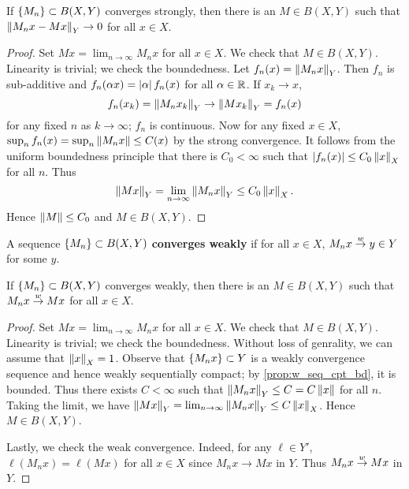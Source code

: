 \begin{proposition}
    If $\left\{ {M_n} \right\}\subset B(X,Y)$ converges strongly, then there is an $M\in B(X,Y)$ such that
    $\left\lVert {M_nx - Mx} \right\rVert_Y\to 0$ for all $x\in X$. 
\end{proposition}
\begin{proof}
    Set $Mx = \lim_{n\to\infty} M_nx$ for all $x\in X$. We check that $M\in B(X,Y)$. 
    Linearity is trivial; we check the boundedness. Let $f_n(x) = \left\lVert {M_nx} \right\rVert_Y$. 
    Then $f_n$ is sub-additive and $f_n(\alpha x) = \left\lvert {\alpha} \right\rvert f_n(x)$ for all $\alpha\in\mathbb{R}$. 
    If $x_k\to x$, 
    \begin{equation*}
        f_n(x_k) = \left\lVert {M_nx_k} \right\rVert_Y\to\left\lVert {Mx_k} \right\rVert_Y = f_n(x)
    \end{equation*}
    for any fixed $n$ as $k\to\infty$; $f_n$ is continuous. Now for any fixed $x\in X$, 
    $\sup_n f_n(x) = \sup_n \left\lVert {M_nx} \right\rVert\leq C(x)$ by the strong convergence. It follows 
    from the uniform boundedness principle that there is $C_0<\infty$ such that 
    $\left\lvert {f_n(x)} \right\rvert\leq C_0\left\lVert {x} \right\rVert_X$ for all $n$. Thus 
    \begin{equation*}
        \left\lVert {Mx} \right\rVert_Y = \lim_{n\to\infty} \left\lVert {M_nx} \right\rVert_Y \leq C_0\left\lVert {x} \right\rVert_X.
    \end{equation*}
    Hence $\left\lVert {M} \right\rVert\leq C_0$ and $M\in B(X,Y)$.
\end{proof}

\begin{definition}
    A sequence $\left\{ {M_n} \right\}\subset B(X,Y)$ \textbf{converges weakly} if for all 
    $x\in X$, $M_nx\overset{w}{\to} y\in Y$ for some $y$. 
\end{definition}

\begin{proposition}
    If $\left\{ {M_n} \right\}\subset B(X,Y)$ converges weakly, then there is an $M\in B(X,Y)$ such that 
    $M_nx\overset{w}{\to} Mx$ for all $x\in X$.
\end{proposition}
\begin{proof}
    Set $Mx = \lim_{n\to\infty} M_nx$ for all $x\in X$. We check that $M\in B(X,Y)$. 
    Linearity is trivial; we check the boundedness. Without loss of genrality, we can 
    assume that $\left\lVert {x} \right\rVert_X = 1$. Observe that $\left\{ {M_nx} \right\}\subset Y$ 
    is a weakly convergence sequence and hence weakly sequentially compact; by 
    \cref{prop:w_seq_cpt_bd}, it is bounded. Thus there exists $C<\infty$ such that
    $\left\lVert {M_nx} \right\rVert_Y\leq C = C\left\lVert {x} \right\rVert$ for all $n$. Taking the limit, we have 
    $\left\lVert {Mx} \right\rVert_Y = \lim_{n\to\infty} \left\lVert {M_nx} \right\rVert_Y\leq C\left\lVert {x} \right\rVert_X$. Hence $M\in B(X,Y)$.
    
    Lastly, we check the weak convergence. Indeed, for any $\ell\in Y'$, 
    $\ell(M_nx) = \ell(Mx)$ for all $x\in X$ since $M_nx\to Mx$ in $Y$. 
    Thus $M_nx\overset{w}{\to} Mx$ in $Y$. 
\end{proof}